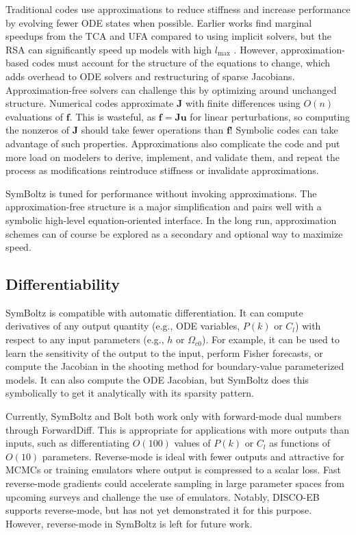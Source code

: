 \documentclass{aa}
\newcommand\lmax{l_\text{max}}
\begin{document}
Traditional codes use approximations to reduce stiffness and increase performance by evolving fewer ODE states when possible.
Earlier works find marginal speedups from the TCA and UFA compared to using implicit solvers,
but the RSA can significantly speed up models with high $\lmax$ \citep{lesgourguesCosmicLinearAnisotropy2011a,moserSymbolicImplementationExtensions2022,hahnDISCODJDifferentiableEinsteinBoltzmann2024}.
However, approximation-based codes must account for the structure of the equations to change, which adds overhead to ODE solvers and restructuring of sparse Jacobians.
Approximation-free solvers can challenge this by optimizing around unchanged structure.
Numerical codes approximate $\boldsymbol{J}$ with finite differences using $O(n)$ evaluations of $\boldsymbol{f}$.
This is wasteful, as $\boldsymbol{f} = \boldsymbol{J} \boldsymbol{u}$ for linear perturbations, so computing the nonzeros of $\boldsymbol{J}$ should take fewer operations than $\boldsymbol{f}$!
Symbolic codes can take advantage of such properties.
Approximations also complicate the code and put more load on modelers to derive, implement, and validate them,
and repeat the process as modifications reintroduce stiffness or invalidate approximations.

SymBoltz is tuned for performance without invoking approximations.
The approximation-free structure is a major simplification and pairs well with a symbolic high-level equation-oriented interface.
In the long run, approximation schemes can of course be explored as a secondary and optional way to maximize speed.

\subsection{Differentiability}
\label{sec:diff}

SymBoltz is compatible with automatic differentiation.
It can compute derivatives of any output quantity (e.g., ODE variables, $P(k)$ or $C_l$) with respect to any input parameters (e.g., $h$ or $\Omega_{c0}$).
For example, it can be used to learn the sensitivity of the output to the input, perform Fisher forecasts, or compute the Jacobian in the shooting method for boundary-value parameterized models.
It can also compute the ODE Jacobian, but SymBoltz does this symbolically to get it analytically with its sparsity pattern.

Currently, SymBoltz and Bolt both work only with forward-mode dual numbers through ForwardDiff.
This is appropriate for applications with more outputs than inputs, such as differentiating $O(100)$ values of $P(k)$ or $C_l$ as functions of $O(10)$ parameters.
Reverse-mode is ideal with fewer outputs and attractive for MCMCs or training emulators where output is compressed to a scalar loss.
Fast reverse-mode gradients could accelerate sampling in large parameter spaces from upcoming surveys and challenge the use of emulators.
Notably, DISCO-EB supports reverse-mode, but has not yet demonstrated it for this purpose.
However, reverse-mode in SymBoltz is left for future work.
\end{document}
